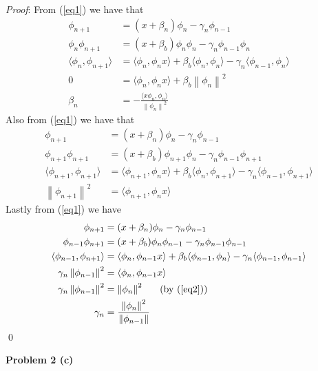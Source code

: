 \documentclass[12pt]{article}
\newcommand{\problem}[1]{\hspace{-4 ex} \large \textbf{Problem #1} }
\newcommand{\norm}[1]{\left\lVert#1\right\rVert}
\renewenvironment{proof}{\hspace{-4 ex} \emph{Proof}:}{\qed}
\begin{document}
	\begin{proof}
		From (\ref{eq1}) we have that
		\begin{align*}
			\phi_{n+1} & = (x + \beta_n) \phi_n - \gamma_n \phi_{n-1} \\
			\phi_n \phi_{n+1} & = (x + \beta_b)\phi_n \phi_n - \gamma_n \phi_{n-1}\phi_n \\
			\langle \phi_n, \phi_{n+1} \rangle & = \langle \phi_n, \phi_nx \rangle + \beta_b \langle \phi_n, \phi_n \rangle - \gamma_n \langle \phi_{n-1}, \phi_n \rangle \\
			0 & = \langle \phi_n, \phi_nx \rangle + \beta_b \norm{\phi_n}^2 \\ 
			\beta_n & = - \frac{\langle x \phi_n, \phi_n \rangle}{\norm{\phi_n}^2}
		\end{align*}
		Also from (\ref{eq1}) we have that
		\begin{align}
			\phi_{n+1} & = (x + \beta_n) \phi_n - \gamma_n \phi_{n-1} \nonumber \\
			\phi_{n+1} \phi_{n+1} & = (x + \beta_b)\phi_{n+1} \phi_n - \gamma_n \phi_{n-1}\phi_{n+1} \nonumber \\
			\langle \phi_{n+1}, \phi_{n+1} \rangle & = \langle \phi_{n+1}, \phi_nx \rangle + \beta_b \langle \phi_n, \phi_{n+1} \rangle - \gamma_n \langle \phi_{n-1}, \phi_{n+1} \rangle \nonumber \\
			\norm{\phi_{n+1}}^2 & = \langle \phi_{n+1}, \phi_nx \rangle \label{eq2}
		\end{align}
		Lastly from (\ref{eq1}) we have
		\begin{align*}
			\phi_{n+1} & = (x + \beta_n) \phi_n - \gamma_n \phi_{n-1} \\
			\phi_{n-1} \phi_{n+1} & = (x + \beta_b)\phi_n \phi_{n-1} - \gamma_n \phi_{n-1}\phi_{n-1} \\
			\langle \phi_{n-1}, \phi_{n+1} \rangle & = \langle \phi_{n}, \phi_{n-1}x \rangle + \beta_b \langle \phi_{n-1}, \phi_n \rangle - \gamma_n \langle \phi_{n-1}, \phi_{n-1} \rangle \\
			\gamma_n \norm{\phi_{n-1}}^2 & = \langle \phi_n, \phi_{n-1}x \rangle \\ 
			\gamma_n \norm{\phi_{n-1}}^2 & = \norm{\phi_{n}}^2 \text{\ \ \ \ \  (by (\ref{eq2}))}\\ 
			\gamma_n & = \frac{\norm{\phi_n}^2}{ \norm{\phi_{n-1}}}
		\end{align*}
	\end{proof}

\problem{2 (c)} \\
\end{document}
